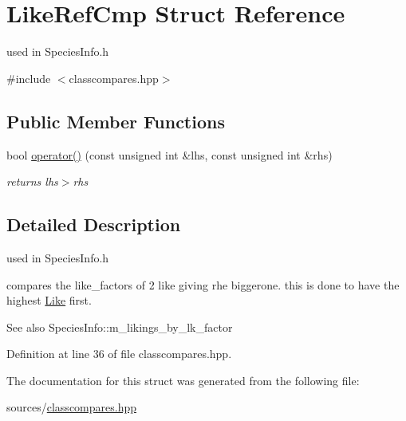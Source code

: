 \hypertarget{structLikeRefCmp}{
\section{LikeRefCmp Struct Reference}
\label{structLikeRefCmp}
}


used in SpeciesInfo.h  




{\ttfamily \#include $<$classcompares.hpp$>$}

\subsection*{Public Member Functions}
\begin{DoxyCompactItemize}
\item 
\hypertarget{structLikeRefCmp_ac1b3915f2c65ec89adc4b0dba2fa4bb7}{
bool \hyperlink{structLikeRefCmp_ac1b3915f2c65ec89adc4b0dba2fa4bb7}{operator()} (const unsigned int \&lhs, const unsigned int \&rhs)}
\label{structLikeRefCmp_ac1b3915f2c65ec89adc4b0dba2fa4bb7}

\begin{DoxyCompactList}\small\item\em returns lhs$>$rhs \end{DoxyCompactList}\end{DoxyCompactItemize}


\subsection{Detailed Description}
used in SpeciesInfo.h 

compares the like\_\-factors of 2 like giving rhe biggerone. this is done to have the highest \hyperlink{structLike}{Like} first. \begin{DoxySeeAlso}{See also}
SpeciesInfo::m\_\-likings\_\-by\_\-lk\_\-factor 
\end{DoxySeeAlso}


Definition at line 36 of file classcompares.hpp.



The documentation for this struct was generated from the following file:\begin{DoxyCompactItemize}
\item 
sources/\hyperlink{classcompares_8hpp}{classcompares.hpp}\end{DoxyCompactItemize}

